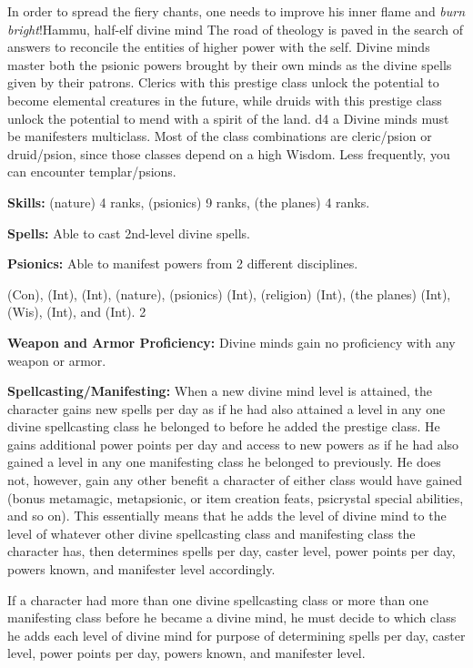 {In order to spread the fiery chants, one needs to improve his inner flame and \emph{burn bright}!}{Hammu, half-elf divine mind}
{
The road of theology is paved in the search of answers to reconcile the entities of higher power with the self. Divine minds master both the psionic powers brought by their own minds as the divine spells given by their patrons. Clerics with this prestige class unlock the potential to become elemental creatures in the future, while druids with this prestige class unlock the potential to mend with a spirit of the land.
}
{d4}
{a}
{Divine minds must be manifesters multiclass. Most of the class combinations are cleric/psion or druid/psion, since those classes depend on a high Wisdom. Less frequently, you can encounter templar/psions.}
{
\textbf{Skills:}  (nature) 4 ranks,  (psionics) 9 ranks,  (the planes) 4 ranks.

\textbf{Spells:} Able to cast 2nd-level divine spells.

\textbf{Psionics:} Able to manifest powers from 2 different disciplines.
}
{
 (Con),  (Int),  (Int),  (nature),  (psionics) (Int),  (religion) (Int),  (the planes) (Int),  (Wis),  (Int), and  (Int).
}
{2}
{}{}
{
\textbf{Weapon and Armor Proficiency:} Divine minds gain no proficiency with any weapon or armor.

\textbf{Spellcasting/Manifesting:} When a new divine mind level is attained, the character gains new spells per day as if he had also attained a level in any one divine spellcasting class he belonged to before he added the prestige class. He gains additional power points per day and access to new powers as if he had also gained a level in any one manifesting class he belonged to previously. He does not, however, gain any other benefit a character of either class would have gained (bonus metamagic, metapsionic, or item creation feats, psicrystal special abilities, and so on). This essentially means that he adds the level of divine mind to the level of whatever other divine spellcasting class and manifesting class the character has, then determines spells per day, caster level, power points per day, powers known, and manifester level accordingly.

If a character had more than one divine spellcasting class or more than one manifesting class before he became a divine mind, he must decide to which class he adds each level of divine mind for purpose of determining spells per day, caster level, power points per day, powers known, and manifester level.
}
